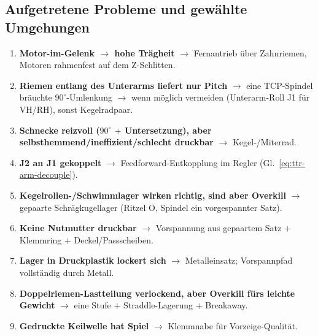 \subsection{Aufgetretene Probleme und gew\"ahlte Umgehungen}
\label{sec:ttr-arm-probleme}
\begin{enumerate}
  \item \textbf{Motor-im-Gelenk $\rightarrow$ hohe Tr\"agheit} $\rightarrow$
        Fernantrieb \"uber Zahnriemen, Motoren rahmenfest auf dem Z-Schlitten.
  \item \textbf{Riemen entlang des Unterarms liefert nur Pitch} $\rightarrow$ eine
        TCP-Spindel br\"auchte $90^\circ$-Umlenkung $\rightarrow$ wenn m\"oglich
        vermeiden (Unterarm-Roll J1 f\"ur VH/RH), sonst Kegelradpaar.
  \item \textbf{Schnecke reizvoll ($90^\circ$ $+$ Untersetzung), aber
        selbsthemmend/ineffizient/schlecht druckbar} $\rightarrow$ Kegel-/Miterrad.
  \item \textbf{J2 an J1 gekoppelt} $\rightarrow$ Feedforward-Entkopplung im Regler
        (Gl.~\eqref{eq:ttr-arm-decouple}).
  \item \textbf{Kegelrollen-/Schwimmlager wirken \glqq richtig\grqq, sind aber
        Overkill} $\rightarrow$ gepaarte Schr\"agkugellager (Ritzel O, Spindel ein
        vorgespannter Satz).
  \item \textbf{Keine Nutmutter druckbar} $\rightarrow$ Vorspannung aus gepaartem
        Satz $+$ Klemmring $+$ Deckel/Passscheiben.
  \item \textbf{Lager in Druckplastik lockert sich} $\rightarrow$ Metalleinsatz;
        Vorspannpfad vollst\"andig durch Metall.
  \item \textbf{Doppelriemen-Lastteilung verlockend, aber Overkill f\"urs leichte
        Gewicht} $\rightarrow$ eine Stufe $+$ Straddle-Lagerung $+$ Breakaway.
  \item \textbf{Gedruckte Keilwelle hat Spiel} $\rightarrow$ Klemmnabe f\"ur
        Vorzeige-Qualit\"at.
\end{enumerate}
